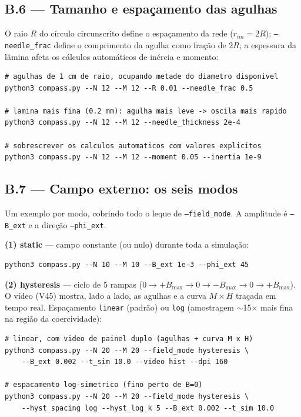 \documentclass[11pt,a4paper]{article}
\newcommand{\code}[1]{\texttt{#1}}
\begin{document}
\subsection*{B.6 --- Tamanho e espaçamento das agulhas}

O raio $R$ do círculo circunscrito define o espaçamento da rede
($r_{nn} = 2R$); \code{--needle\_frac} define o comprimento da agulha
como fração de $2R$; a espessura da lâmina afeta os cálculos
automáticos de inércia e momento:
\begin{verbatim}
# agulhas de 1 cm de raio, ocupando metade do diametro disponivel
python3 compass.py --N 12 --M 12 --R 0.01 --needle_frac 0.5

# lamina mais fina (0.2 mm): agulha mais leve -> oscila mais rapido
python3 compass.py --N 12 --M 12 --needle_thickness 2e-4

# sobrescrever os calculos automaticos com valores explicitos
python3 compass.py --N 12 --M 12 --moment 0.05 --inertia 1e-9
\end{verbatim}

\subsection*{B.7 --- Campo externo: os seis modos}

Um exemplo por modo, cobrindo todo o leque de \code{--field\_mode}. A
amplitude é \code{--B\_ext} e a direção \code{--phi\_ext}.

\medskip\noindent\textbf{(1) static} --- campo constante (ou nulo)
durante toda a simulação:
\begin{verbatim}
python3 compass.py --N 10 --M 10 --B_ext 1e-3 --phi_ext 45
\end{verbatim}

\noindent\textbf{(2) hysteresis} --- ciclo de 5 rampas
($0 \to +B_{\max} \to 0 \to -B_{\max} \to 0 \to +B_{\max}$). O vídeo
(V45) mostra, lado a lado, as agulhas e a curva $M\times H$ traçada em
tempo real. Espaçamento \code{linear} (padrão) ou \code{log} (amostragem
$\sim$15$\times$ mais fina na região da coercividade):
\begin{verbatim}
# linear, com video de painel duplo (agulhas + curva M x H)
python3 compass.py --N 20 --M 20 --field_mode hysteresis \
    --B_ext 0.002 --t_sim 10.0 --video hist --dpi 160

# espacamento log-simetrico (fino perto de B=0)
python3 compass.py --N 20 --M 20 --field_mode hysteresis \
    --hyst_spacing log --hyst_log_k 5 --B_ext 0.002 --t_sim 10.0
\end{verbatim}
\end{document}

